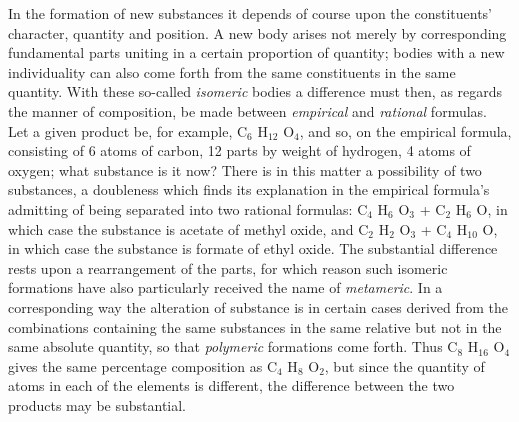 \documentclass[12pt,a4paper]{book}
\begin{document}
In the formation of new substances it depends of course upon the constituents' character, quantity and position. A new
body arises not merely by corresponding fundamental parts uniting in a certain proportion of quantity; bodies with a
new individuality can also come forth from the same constituents in the same quantity. With these so-called
\emph{isomeric} bodies a difference must then, as regards the manner of composition, be made between \emph{empirical}
and \emph{rational} formulas.
Let a given product be, for example, C$_6$ H$_{12}$ O$_4$, and so, on the empirical formula, consisting of 6 atoms of
carbon, 12 parts by weight of hydrogen, 4 atoms of oxygen; what substance is it now? There is in this matter a
possibility of two substances, a doubleness which finds its explanation in the empirical formula's admitting of being
separated into two rational formulas: C$_4$ H$_6$ O$_3$ + C$_2$ H$_6$ O, in which case the substance is acetate of
methyl oxide, and C$_2$ H$_2$ O$_3$ + C$_4$ H$_{10}$ O, in which case the substance is formate of ethyl oxide. The
substantial difference rests upon a rearrangement of the parts, for which reason such isomeric formations have also
particularly received the name of \emph{metameric}. In a corresponding way the alteration of substance is in certain
cases derived from the combinations containing the same substances in the same relative but not in the same absolute
quantity, so that \emph{polymeric} formations come forth. Thus C$_8$ H$_{16}$ O$_4$ gives the same percentage
composition as C$_4$ H$_8$ O$_2$, but since the quantity of atoms in each of the elements is different, the difference
between the two products may be substantial.
\end{document}
